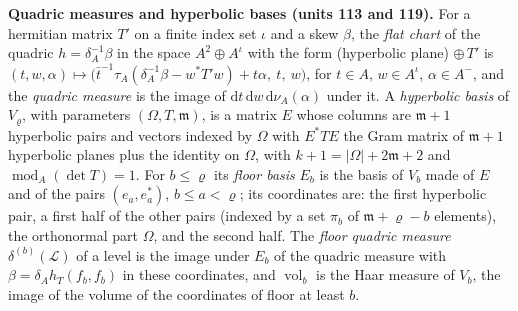 \documentclass[11pt,a4paper]{article}
\newcommand{\subhead}[1]{\par\addvspace{9pt plus 2pt}\Needspace{4\baselineskip}\noindent\textbf{#1}\enspace\ignorespaces}
\theoremstyle{plainx}
\theoremstyle{uprightx}
\newcommand{\cL}{\mathcal{L}}
\newcommand{\dd}{\mathrm{d}}
\newcommand{\modA}{\operatorname{mod}_A}
\newcommand{\vol}{\operatorname{vol}}
\newcommand{\quadric}[2]{\delta^{(#2)}(#1)}
\begin{document}
\subhead{Quadric measures and hyperbolic bases (units 113 and 119).} For a hermitian matrix $T'$ on a finite index
set $\iota$ and a skew $\beta$, the \emph{flat chart} of the quadric $h=\delta_A^{-1}\beta$ in the space
$A^2\oplus A^{\iota}$ with the form (hyperbolic plane) $\oplus\,T'$ is
$(t,w,\alpha)\mapsto\bigl(\bar t^{-1}\tau_A(\delta_A^{-1}\beta-w^{*}T'w)+t\alpha,\ t,\ w\bigr)$, for $t\in A$,
$w\in A^{\iota}$, $\alpha\in A^{-}$, and the \emph{quadric measure} is the image of $\dd t\,\dd w\,\dd\nu_A(\alpha)$
under it. A \emph{hyperbolic basis} of $V_\varrho$, with parameters $(\Omega,T,\mathfrak{m})$, is a matrix $E$ whose
columns are $\mathfrak{m}+1$ hyperbolic pairs and vectors indexed by $\Omega$ with $E^{*}TE$ the Gram matrix of
$\mathfrak{m}+1$ hyperbolic planes plus the identity on $\Omega$, with $k+1=|\Omega|+2\mathfrak{m}+2$ and
$\modA(\det T)=1$. For $b\le\varrho$ its \emph{floor basis} $E_b$ is the basis of $V_b$ made of $E$ and of the pairs
$(e_a,e^*_a)$, $b\le a<\varrho$; its coordinates are: the first hyperbolic pair, a first half of the other pairs
(indexed by a set $\pi_b$ of $\mathfrak{m}+\varrho-b$ elements), the orthonormal part $\Omega$, and the second half.
The \emph{floor quadric measure} $\quadric{\cL}{b}$ of a level is the image under $E_b$ of the quadric measure with
$\beta=\delta_Ah_T(f_b,f_b)$ in these coordinates, and $\vol_b$ is the Haar measure of $V_b$, the image of the volume
of the coordinates of floor at least $b$.
\end{document}

